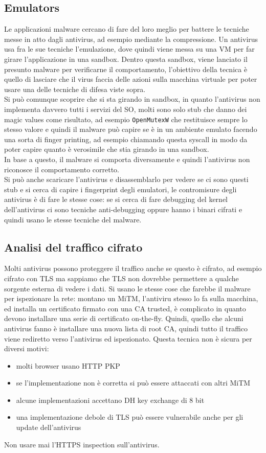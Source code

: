 \documentclass[12pt, oneside]{extbook} %
\begin{document}
\subsection{Emulators}
Le applicazioni malware cercano di fare del loro meglio per battere le tecniche messe in atto dagli antivirus, ad esempio mediante la compressione. Un antivirus usa fra le sue tecniche l'emulazione, dove quindi viene messa su una VM per far girare l'applicazione in una sandbox. Dentro questa sandbox, viene lanciato il presunto malware per verificarne il comportamento, l'obiettivo della tecnica è quello di lasciare che il virus faccia delle azioni sulla macchina virtuale per poter usare una delle tecniche di difesa viste sopra.\\Si può comunque scoprire che si sta girando in sandbox, in quanto l'antivirus non implementa davvero tutti i servizi del SO, molti sono solo stub che danno dei magic values come risultato, ad esempio \texttt{OpenMutexW} che restituisce sempre lo stesso valore e quindi il malware può capire se è in un ambiente emulato facendo una sorta di finger printing, ad esempio chiamando questa syscall in modo da poter capire quanto è verosimile che stia girando in una sandbox.\\In base a questo, il malware si comporta diversamente e quindi l'antivirus non riconosce il comportamento corretto.\\Si può anche scaricare l'antivirus e disassemblarlo per vedere se ci sono questi stub e si cerca di capire i fingerprint degli emulatori, le contromisure degli antivirus è di fare le stesse cose: se si cerca di fare debugging del kernel dell'antivirus ci sono tecniche anti-debugging oppure hanno i binari cifrati e quindi usano le stesse tecniche del malware.
\subsection{Analisi del traffico cifrato}
Molti antivirus possono proteggere il traffico anche se questo è cifrato, ad esempio cifrato con TLS ma sappiamo che TLS non dovrebbe permettere a qualche sorgente esterna di vedere i dati. Si usano le stesse cose che farebbe il malware per ispezionare la rete: montano un MiTM, l'antiviru stesso lo fa sulla macchina, ed installa un certificato firmato con una CA trusted, è complicato in quanto devono installare una serie di certificato on-the-fly. Quindi, quello che alcuni antivirus fanno è installare una nuova lista di root CA, quindi tutto il traffico viene rediretto verso l'antivirus ed ispezionato. Questa tecnica non è sicura per diversi motivi:
\begin{itemize}
	\item molti browser usano HTTP PKP
	\item se l'implementazione non è corretta si può essere attaccati con altri MiTM
	\item alcune implementazioni accettano DH key exchange di 8 bit
	\item una implementazione debole di TLS può essere vulnerabile anche per gli update dell'antivirus
\end{itemize}
Non usare mai l'HTTPS inspection sull'antivirus.
\end{document}
